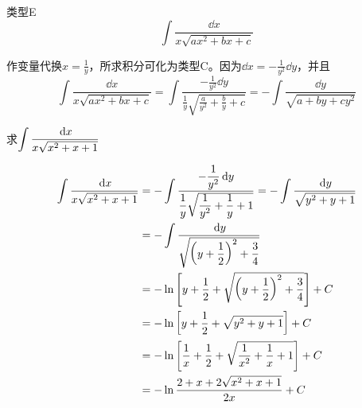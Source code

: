 \begin{blk}{类型E}
    \[\int \frac{\dd x}{x\sqrt{ax^2+bx+c}}\]
\end{blk}

作变量代换$x=\frac{1}{y}$，所求积分可化为类型C。因为$\dd x=-\frac{1}{y^2}\dd y$，并且
\[\int \frac{\dd x}{x\sqrt{ax^2+bx+c}}=\int\frac{-\frac{1}{y^2}\dd y}{\frac{1}{y}\sqrt{\frac{a}{y^2}+\frac{b}{y}+c}}=-\int\frac{\dd y}{\sqrt{a+by+cy^2}}\]

\begin{example}
    求$\displaystyle\int\dfrac{\,{\rm d} x}{x\sqrt{x^2+x+1}}$
\end{example}

\begin{solution}
\[\begin{split}
    \displaystyle\int\dfrac{\,{\rm d} x}{x\sqrt{x^2+x+1}}&=-\int \dfrac{-\dfrac{1}{y^2}\,{\rm d} y}{\dfrac{1}{y}\sqrt{\dfrac{1}{y^2}+\dfrac{1}{y}+1}}=-\int \dfrac{\,{\rm d} y}{\sqrt{y^2+y+1}}\\
    &=-\int \dfrac{\,{\rm d} y }{\sqrt{\left(y+\dfrac{1}{2}\right)^2+\dfrac{3}{4}}}  \\
    &=-\ln \left[y+\dfrac{1}{2}+\sqrt{\left(y+\dfrac{1}{2}\right)^2+\dfrac{3}{4}}\right]+C \\
    &=-\ln \left[y+\dfrac{1}{2}+\sqrt{y^2+y+1}\right]+C\\
    &=-\ln\left[\dfrac{1}{x}+\dfrac{1}{2}+\sqrt{\dfrac{1}{x^2}+\dfrac{1}{x}+1}\right]+C\\
    &=-\ln\dfrac{2+x+2\sqrt{x^2+x+1}}{2x}+C
\end{split}\]
\end{solution}
    
